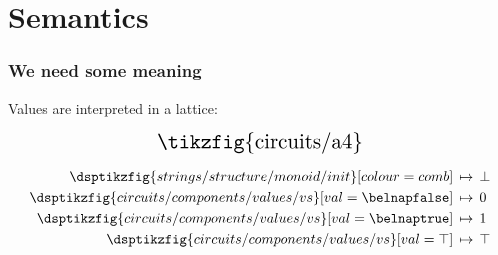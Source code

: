 \section{Semantics}

\begin{frame}
    \frametitle{We need some meaning}

    \pause
    Values are interpreted in a \alert{lattice}:

    \pause
    \begin{minipage}{0.49\textwidth}
        \[
            \scalebox{1.5}{\tikzfig{circuits/a4}}
        \]
    \end{minipage}
    \pause
    \begin{minipage}{0.49\textwidth}
        \begin{align*}
            \dsptikzfig{strings/structure/monoid/init}[colour=comb]
            \,&\mapsto\, \bot \\
            \dsptikzfig{circuits/components/values/vs}[val=\belnapfalse]
            \,&\mapsto\, 0 \\
            \dsptikzfig{circuits/components/values/vs}[val=\belnaptrue]
            \,&\mapsto\, 1 \\
            \dsptikzfig{circuits/components/values/vs}[val=\top]
            \,&\mapsto\, \top
        \end{align*}
    \end{minipage}
\end{frame}
